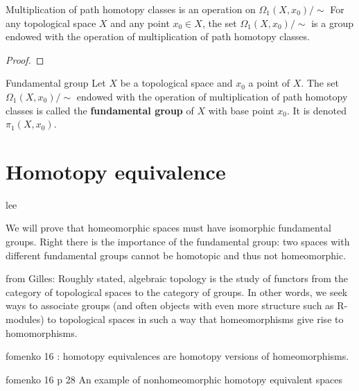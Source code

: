 


\begin{theorem}{Multiplication of path homotopy classes is an operation on \(\Omega_1(X,x_0)  / \!\!\sim\)}{}
    For any topological space \(X\) and any point \(x_0\in X\), the set \(\Omega_1(X,x_0)  / \!\!\sim\) is a group endowed with the operation  of  multiplication of path homotopy classes.
\end{theorem}

\begin{proof}
    
\end{proof}

\begin{definition}{Fundamental group}{}
    Let \(X\) be a topological space and \(x_0\)   a point of \(X\).
    The set \(\Omega_1(X,x_0)  / \!\!\sim\) endowed with the operation  of multiplication of path homotopy classes is called the \textbf{fundamental group} of \(X\) with base point  \(x_0\). It is denoted \(\pi_1(X,x_0)\).
\end{definition}


 

\section{Homotopy equivalence}

lee

We will prove that homeomorphic spaces must have isomorphic fundamental groups. Right there is the importance of the fundamental group: two spaces with different fundamental groups cannot be homotopic and thus not homeomorphic. 



from Gilles:
Roughly stated, algebraic topology is the study of functors from the category
of topological spaces to the category of groups. In other words, we seek
ways to associate groups (and often objects with even more structure such
as R-modules) to topological spaces in such a way that homeomorphisms
give rise to homomorphisms. 


fomenko 16 : homotopy equivalences are homotopy versions of homeomorphisms.


\begin{example}
    fomenko 16 p 28
    An example of nonhomeomorphic homotopy equivalent spaces
\end{example}